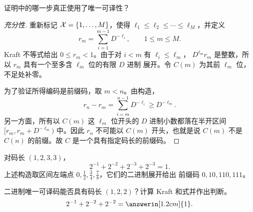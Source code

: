 \begin{yourturn}
证明中的哪一步真正使用了唯一可译性？
\ifshowanswers\else\workspace[2]\fi
{}
\end{yourturn}


\begin{proof}[充分性]
重新标记 $\mathcal{X}=\{1,\ldots,M\}$，使得
$\ell_1\le\ell_2\le\cdots\le\ell_M$，并定义
\[
  r_m=\sum_{i=1}^{m-1}D^{-\ell_i},\qquad 1\le m\le M.
\]
Kraft 不等式给出 $0\le r_m<1$。由于对 $i<m$ 有 $\ell_i\le\ell_m$，
$D^{\ell_m}r_m$ 是整数，所以 $r_m$ 具有一个至多含 $\ell_m$ 位的有限 $D$ 进制
展开。令 $C(m)$ 为其前 $\ell_m$ 位，不足处补零。

为了验证所得编码是前缀码，取 $m<n$。由构造，
\[
  r_n-r_m=\sum_{i=m}^{n-1}D^{-\ell_i}\ge D^{-\ell_m}.
\]
另一方面，所有以 $C(m)$ 这 $\ell_m$ 位开头的 $D$ 进制小数都落在半开区间
$[r_m,r_m+D^{-\ell_m})$ 中。因此 $r_n$ 不可能以 $C(m)$ 开头，也就是说
$C(m)$ 不是 $C(n)$ 的前缀。故 $C$ 是一个具有指定码长的前缀码。
\end{proof}

\begin{example}[恰好填满的二进制编码]
对码长 $(1,2,3,3)$，
\[
  2^{-1}+2^{-2}+2^{-3}+2^{-3}=1.
\]
上述构造取区间左端点 $0,\tfrac12,\tfrac34,\tfrac78$，它们的二进制展开给出
前缀码 $0,10,110,111$。
\end{example}

\begin{yourturn}
二进制唯一可译码能否具有码长 $(1,2,2)$？计算 Kraft 和式并作出判断。
\[
  2^{-1}+2^{-2}+2^{-2}=\answerin[1.2cm]{1}.
\]
\end{yourturn}

\vspace{1.2cm}
